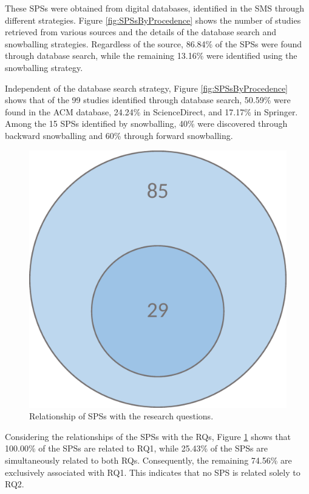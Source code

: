 These SPSs were obtained from digital databases, identified in the SMS through different strategies. Figure \ref{fig:SPSsByProcedence} shows the number of studies retrieved from various sources and the details of the database search and snowballing strategies. Regardless of the source, 86.84\% of the SPSs were found through database search, while the remaining 13.16\% were identified using the snowballing strategy.

Independent of the database search strategy, Figure \ref{fig:SPSsByProcedence} shows that of the 99 studies identified through database search, 50.59\% were found in the ACM database, 24.24\% in ScienceDirect, and 17.17\% in Springer. Among the 15 SPSs identified by snowballing, 40\% were discovered through backward snowballing and 60\% through forward snowballing.

\begin{figure}[htbp]
	\centering
	\vspace{10pt}
	\includegraphics[scale=0.3]{resources/figures/Imagen2.eps}
	\vspace{6pt}
	\caption{Relationship of SPSs with the research questions.}
	\label{fig:SPSsByRQs}
\end{figure}

Considering the relationships of the SPSs with the RQs, Figure \ref{fig:SPSsByRQs} shows that 100.00\% of the SPSs are related to RQ1, while 25.43\% of the SPSs are simultaneously related to both RQs. Consequently, the remaining 74.56\% are exclusively associated with RQ1. This indicates that no SPS is related solely to RQ2.


